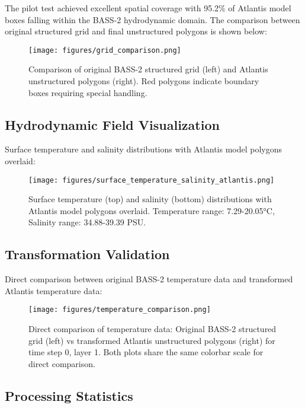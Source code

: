 \documentclass[12pt,a4paper,twoside,times,sky,formal]{csiroreport2017}
\begin{document}
The pilot test achieved excellent spatial coverage with 95.2\% of Atlantis model boxes falling within the BASS-2 hydrodynamic domain. The comparison between original structured grid and final unstructured polygons is shown below:

\begin{figure}[H]
\centering
\texttt{[image: figures/grid\_comparison.png]}
\caption{Comparison of original BASS-2 structured grid (left) and Atlantis unstructured polygons (right). Red polygons indicate boundary boxes requiring special handling.}
\label{fig:grid_comparison}
\end{figure}

\subsection{Hydrodynamic Field Visualization}

Surface temperature and salinity distributions with Atlantis model polygons overlaid:

\begin{figure}[H]
\centering
\texttt{[image: figures/surface\_temperature\_salinity\_atlantis.png]}
\caption{Surface temperature (top) and salinity (bottom) distributions with Atlantis model polygons overlaid. Temperature range: 7.29-20.05°C, Salinity range: 34.88-39.39 PSU.}
\label{fig:surface_fields}
\end{figure}

\subsection{Transformation Validation}

Direct comparison between original BASS-2 temperature data and transformed Atlantis temperature data:

\begin{figure}[H]
\centering
\texttt{[image: figures/temperature\_comparison.png]}
\caption{Direct comparison of temperature data: Original BASS-2 structured grid (left) vs transformed Atlantis unstructured polygons (right) for time step 0, layer 1. Both plots share the same colorbar scale for direct comparison.}
\label{fig:temperature_comparison}
\end{figure}

\subsection{Processing Statistics}
\end{document}
